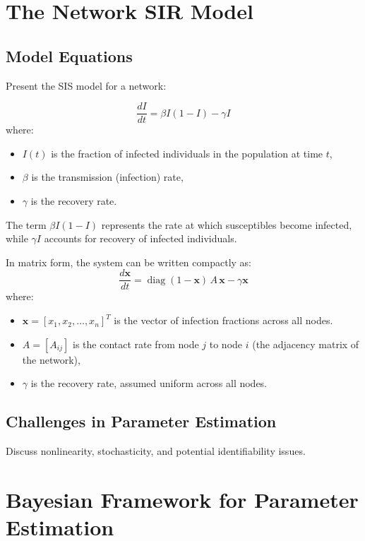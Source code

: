 \documentclass[a4paper,10pt]{report}
\begin{document}
\section{The Network SIR Model}
\subsection{Model Equations}
Present the SIS model for a network:

\[
\boxed{
\frac{dI}{dt} = \beta I (1 - I) - \gamma I
}
\]
where:
\begin{itemize}
    \item $I(t)$ is the fraction of infected individuals in the population at time $t$,
    \item $\beta$ is the transmission (infection) rate,
    \item $\gamma$ is the recovery rate.
\end{itemize}

The term $\beta I (1 - I)$ represents the rate at which susceptibles become infected, while $\gamma I$ accounts for recovery of infected individuals.



In matrix form, the system can be written compactly as:
\[
\boxed{
\frac{d\mathbf{x}}{dt} = \operatorname{diag}(1 - \mathbf{x}) \, A \, \mathbf{x} - \gamma \mathbf{x}
}
\]
where: 
\begin{itemize}
    \item $\mathbf{x} = [x_1, x_2, \dots, x_n]^T$ is the vector of infection fractions across all nodes.
    \item $A = [A_{ij}]$ is the contact rate from node $j$ to node $i$ (the adjacency matrix of the network),
    \item $\gamma$ is the recovery rate, assumed uniform across all nodes.
\end{itemize}


\subsection{Challenges in Parameter Estimation}
Discuss nonlinearity, stochasticity, and potential identifiability issues.

\section{Bayesian Framework for Parameter Estimation}
\end{document}
